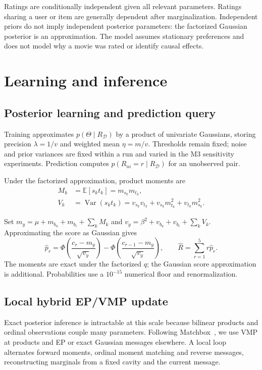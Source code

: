 \documentclass[12pt,a4paper]{article}
\newcommand{\E}{\mathbb E}
\newcommand{\Var}{\operatorname{Var}}
\begin{document}
Ratings are conditionally independent given all relevant parameters. Ratings
sharing a user or item are generally dependent after marginalization. Independent
priors do not imply independent posterior parameters: the factorized Gaussian
posterior is an approximation. The model assumes stationary preferences and does
not model why a movie was rated or identify causal effects.

\section{Learning and inference}
\subsection{Posterior learning and prediction query}
Training approximates $p(\Theta\mid R_{\mathcal D})$ by a product of univariate
Gaussians, storing precision $\lambda=1/v$ and weighted mean $\eta=m/v$.
Thresholds remain fixed; noise and prior variances are fixed within a run and varied in the M3 sensitivity experiments. Prediction computes
$p(R_{ui}=r\mid R_{\mathcal D})$ for an unobserved pair.

Under the factorized approximation, product moments are
\begin{align}
M_k&=\E[s_kt_k]=m_{s_k}m_{t_k},\\
V_k&=\Var(s_kt_k)=v_{s_k}v_{t_k}+v_{s_k}m_{t_k}^{2}+v_{t_k}m_{s_k}^{2}.
\end{align}
\begin{samepage}
Set $m_y=\mu+m_{b_u}+m_{b_i}+\sum_kM_k$ and
$v_y=\beta^2+v_{b_u}+v_{b_i}+\sum_kV_k$. Approximating the score as Gaussian gives
\begin{equation}
\widehat p_r=\Phi\!\left(\frac{c_r-m_y}{\sqrt{v_y}}\right)
-\Phi\!\left(\frac{c_{r-1}-m_y}{\sqrt{v_y}}\right),\qquad
\widehat R=\sum_{r=1}^{5}r\widehat p_r.\label{eq:prediction}
\end{equation}
The moments are exact under the factorized $q$; the Gaussian score approximation
is additional. Probabilities use a $10^{-15}$ numerical floor and renormalization.
\end{samepage}

\subsection{Local hybrid EP/VMP update}
Exact posterior inference is intractable at this scale because bilinear products
and ordinal observations couple many parameters. Following Matchbox~\cite{stern2009},
we use VMP at products and EP or exact Gaussian messages elsewhere. A local loop
alternates forward moments, ordinal moment matching and reverse messages,
reconstructing marginals from a fixed cavity and the current message.
\end{document}
